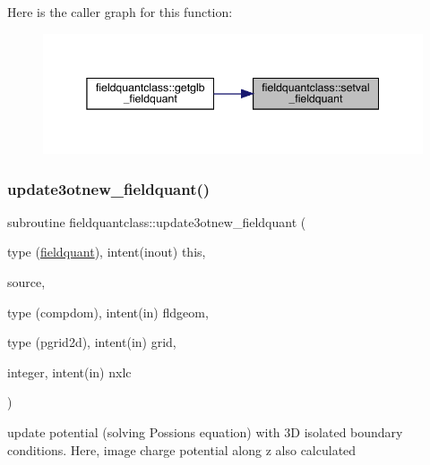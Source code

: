 Here is the caller graph for this function\+:\nopagebreak
\begin{figure}[H]
\begin{center}
\leavevmode
\includegraphics[width=345pt]{namespacefieldquantclass_a05318a0c571b3210e31af48028673474_icgraph}
\end{center}
\end{figure}
\mbox{\label{namespacefieldquantclass_a06d0461c3c52859b9fa8b0c4d5f0db46}} 
\subsubsection{\texorpdfstring{update3otnew\_fieldquant()}{update3otnew\_fieldquant()}}
{\footnotesize\ttfamily subroutine fieldquantclass\+::update3otnew\+\_\+fieldquant (\begin{DoxyParamCaption}\item[{type (\mbox{\hyperlink{namespacefieldquantclass_structfieldquantclass_1_1fieldquant}{fieldquant}}), intent(inout)}]{this,  }\item[{}]{source,  }\item[{type (compdom), intent(in)}]{fldgeom,  }\item[{type (pgrid2d), intent(in)}]{grid,  }\item[{integer, intent(in)}]{nxlc }\end{DoxyParamCaption})}



update potential (solving Possion\textquotesingle{}s equation) with 3D isolated boundary conditions. Here, image charge potential along z also calculated 

